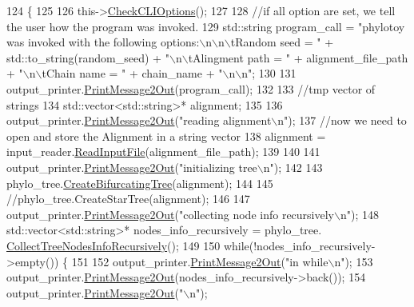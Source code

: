 \begin{DoxyCode}
124                      \{
125   
126   this->\hyperlink{classController_a1307438a1590b0deff238e4ee46aaed3}{CheckCLIOptions}();
127   
128   \textcolor{comment}{//if all option are set, we tell the user how the program was invoked.}
129   std::string program\_call = \textcolor{stringliteral}{"phylotoy was invoked with the following options:\(\backslash\)n\(\backslash\)n\(\backslash\)tRandom seed = "} + 
      std::to\_string(random\_seed) + \textcolor{stringliteral}{"\(\backslash\)n\(\backslash\)tAlingment path = "} + alignment\_file\_path + \textcolor{stringliteral}{"\(\backslash\)n\(\backslash\)tChain name = "} + chain\_name + \textcolor{stringliteral}{
      "\(\backslash\)n\(\backslash\)n"};
130   
131   output\_printer.\hyperlink{classOutputPrinter_ae9cd642df56fb6febef4cccff7ca12f2}{PrintMessage2Out}(program\_call);  
132   
133   \textcolor{comment}{//tmp vector of strings}
134   std::vector<std::string>* alignment;
135   
136   output\_printer.\hyperlink{classOutputPrinter_ae9cd642df56fb6febef4cccff7ca12f2}{PrintMessage2Out}(\textcolor{stringliteral}{"reading alignment\(\backslash\)n"});
137   \textcolor{comment}{//now we need to open and store the Alignment in a string vector}
138   alignment = input\_reader.\hyperlink{classInputReader_ad16dc3ebc228f45257b9ad4c3f62ed14}{ReadInputFile}(alignment\_file\_path);
139   
140   
141   output\_printer.\hyperlink{classOutputPrinter_ae9cd642df56fb6febef4cccff7ca12f2}{PrintMessage2Out}(\textcolor{stringliteral}{"initializing tree\(\backslash\)n"});
142   
143   phylo\_tree.\hyperlink{classTree_ac456dedd5e42bb0fea807aeb526e5a93}{CreateBifurcatingTree}(alignment);
144   
145   \textcolor{comment}{//phylo\_tree.CreateStarTree(alignment);}
146   
147   output\_printer.\hyperlink{classOutputPrinter_ae9cd642df56fb6febef4cccff7ca12f2}{PrintMessage2Out}(\textcolor{stringliteral}{"collecting node info recursively\(\backslash\)n"});
148   std::vector<std::string>* nodes\_info\_recursively = phylo\_tree.
      \hyperlink{classTree_af09073cc7b7166d16213614b624f3388}{CollectTreeNodesInfoRecursively}();
149   
150   \textcolor{keywordflow}{while}(!nodes\_info\_recursively->empty()) \{
151     
152     output\_printer.\hyperlink{classOutputPrinter_ae9cd642df56fb6febef4cccff7ca12f2}{PrintMessage2Out}(\textcolor{stringliteral}{"in while\(\backslash\)n"});
153     output\_printer.\hyperlink{classOutputPrinter_ae9cd642df56fb6febef4cccff7ca12f2}{PrintMessage2Out}(nodes\_info\_recursively->back());
154     output\_printer.\hyperlink{classOutputPrinter_ae9cd642df56fb6febef4cccff7ca12f2}{PrintMessage2Out}(\textcolor{stringliteral}{"\(\backslash\)n"});

\end{DoxyCode}

